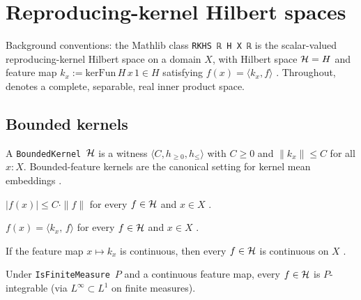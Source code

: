 \chapter{Reproducing-kernel Hilbert spaces}\label{chap:rkhs}

Background conventions: the Mathlib class \texttt{RKHS ℝ H X ℝ} is the
scalar-valued reproducing-kernel Hilbert space on a domain $X$, with
Hilbert space $\mathcal{H} = H$ and feature map
$k_x := \mathrm{kerFun}\,H\,x\,1 \in H$ satisfying
$f(x) = \langle k_x, f \rangle$ \cite{aronszajn1950}. Throughout,
\RKHS{} denotes a complete, separable, real inner product space.

\section{Bounded kernels}\label{sec:bounded-kernel}

\begin{defn}
\label{def:bounded-kernel}
  \leanok
A \texttt{BoundedKernel}~$\mathcal{H}$ is a witness $\langle C, h_{\ge 0}, h_{\le} \rangle$
with $C \ge 0$ and $\| k_x \| \le C$ for all $x : X$. Bounded-feature
kernels are the canonical setting for kernel mean embeddings
\cite[\S4.2]{steinwart-christmann}.
\end{defn}

\begin{thm}
\label{thm:eval-bound}
  \leanok
$|f(x)| \le C \cdot \|f\|$ for every $f \in \mathcal{H}$ and $x \in X$
\cite[Thm~4.23]{steinwart-christmann}.
\end{thm}

\begin{thm}
\label{thm:rkhs-eval-eq-inner}
  \leanok
$f(x) = \langle k_x,\, f \rangle$ for every $f \in \mathcal{H}$ and
$x \in X$ \cite{aronszajn1950}.
\end{thm}

\begin{thm}
\label{thm:continuous-rkhs-apply}
  \leanok
If the feature map $x \mapsto k_x$ is continuous, then every
$f \in \mathcal{H}$ is continuous on $X$
\cite[Lemma~4.29]{steinwart-christmann}.
\end{thm}

\begin{thm}
\label{thm:rkhs-fun-integrable}
  \leanok
Under \texttt{IsFiniteMeasure}~$P$ and a continuous feature map,
every $f \in \mathcal{H}$ is $P$-integrable
(via $L^\infty \subset L^1$ on finite measures).
\end{thm}

